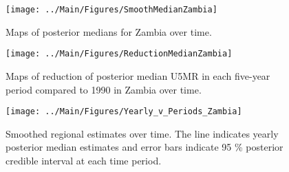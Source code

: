 \documentclass[12pt]{article}\usepackage[]{graphicx}\usepackage[]{color}
\newenvironment{knitrout}{}{} %
\begin{document}
\begin{knitrout}
\color{fgcolor}\begin{figure}[bht]

{\centering \texttt{[image: ../Main/Figures/SmoothMedianZambia]} 

}

\caption[Maps of posterior medians for Zambia  over time]{Maps of posterior medians for Zambia  over time.}\label{fig:unnamed-chunk-334}
\end{figure}


\end{knitrout}
\begin{knitrout}
\color{fgcolor}\begin{figure}[bht]

{\centering \texttt{[image: ../Main/Figures/ReductionMedianZambia]} 

}

\caption[Maps of reduction of posterior median U5MR in each five-year period compared to 1990 in Zambia over time]{Maps of reduction of posterior median U5MR in each five-year period compared to 1990 in Zambia over time.}\label{fig:unnamed-chunk-335}
\end{figure}


\end{knitrout}
\begin{knitrout}
\color{fgcolor}\begin{figure}[bht]

{\centering \texttt{[image: ../Main/Figures/Yearly\_v\_Periods\_Zambia]} 

}

\caption[Smoothed regional estimates over time]{Smoothed regional estimates over time. The line indicates yearly posterior median estimates and error bars indicate 95 \% posterior credible interval at each time period.}\label{fig:unnamed-chunk-336}
\end{figure}


\end{knitrout}
\end{document}
